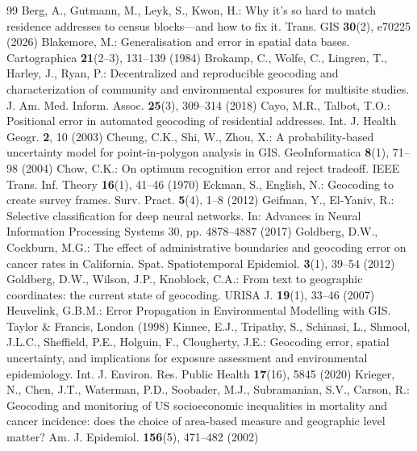 \documentclass[runningheads]{llncs}
\begin{document}
\begin{thebibliography}{99}
 Berg, A., Gutmann, M., Leyk, S., Kwon, H.: Why it's so hard to match residence addresses to census blocks---and how to fix it. Trans. GIS \textbf{30}(2), e70225 (2026)
 Blakemore, M.: Generalisation and error in spatial data bases. Cartographica \textbf{21}(2--3), 131--139 (1984)
 Brokamp, C., Wolfe, C., Lingren, T., Harley, J., Ryan, P.: Decentralized and reproducible geocoding and characterization of community and environmental exposures for multisite studies. J. Am. Med. Inform. Assoc. \textbf{25}(3), 309--314 (2018)
 Cayo, M.R., Talbot, T.O.: Positional error in automated geocoding of residential addresses. Int. J. Health Geogr. \textbf{2}, 10 (2003)
 Cheung, C.K., Shi, W., Zhou, X.: A probability-based uncertainty model for point-in-polygon analysis in GIS. GeoInformatica \textbf{8}(1), 71--98 (2004)
 Chow, C.K.: On optimum recognition error and reject tradeoff. IEEE Trans. Inf. Theory \textbf{16}(1), 41--46 (1970)
 Eckman, S., English, N.: Geocoding to create survey frames. Surv. Pract. \textbf{5}(4), 1--8 (2012)
 Geifman, Y., El-Yaniv, R.: Selective classification for deep neural networks. In: Advances in Neural Information Processing Systems 30, pp. 4878--4887 (2017)
 Goldberg, D.W., Cockburn, M.G.: The effect of administrative boundaries and geocoding error on cancer rates in California. Spat. Spatiotemporal Epidemiol. \textbf{3}(1), 39--54 (2012)
 Goldberg, D.W., Wilson, J.P., Knoblock, C.A.: From text to geographic coordinates: the current state of geocoding. URISA J. \textbf{19}(1), 33--46 (2007)
 Heuvelink, G.B.M.: Error Propagation in Environmental Modelling with GIS. Taylor \& Francis, London (1998)
 Kinnee, E.J., Tripathy, S., Schinasi, L., Shmool, J.L.C., Sheffield, P.E., Holguin, F., Clougherty, J.E.: Geocoding error, spatial uncertainty, and implications for exposure assessment and environmental epidemiology. Int. J. Environ. Res. Public Health \textbf{17}(16), 5845 (2020)
 Krieger, N., Chen, J.T., Waterman, P.D., Soobader, M.J., Subramanian, S.V., Carson, R.: Geocoding and monitoring of US socioeconomic inequalities in mortality and cancer incidence: does the choice of area-based measure and geographic level matter? Am. J. Epidemiol. \textbf{156}(5), 471--482 (2002)

\end{thebibliography}
\end{document}
